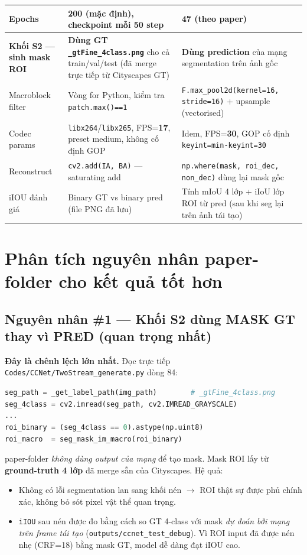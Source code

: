 \documentclass[12pt,a4paper]{article}
\begin{document}
\begin{table}[H]
\begin{tabular}{p{3.3cm} p{5.4cm} p{5.4cm}}
\addlinespace
Epochs & 200 (mặc định), checkpoint mỗi 50 step & 47 (theo paper) \\
\midrule
\textbf{Khối S2 — sinh mask ROI} &
  \textbf{Dùng GT $\,$\texttt{\_gtFine\_4class.png}} cho cả train/val/test (đã merge trực tiếp từ Cityscapes GT) &
  \textbf{Dùng prediction} của mạng segmentation trên ảnh gốc \\
\addlinespace
Macroblock filter &
  Vòng for Python, kiểm tra \texttt{patch.max()==1} &
  \texttt{F.max\_pool2d(kernel=16, stride=16)} + upsample (vectorised) \\
\addlinespace
Codec params &
  \texttt{libx264}/\texttt{libx265}, FPS=\textbf{17}, preset medium, không cố định GOP &
  Idem, FPS=\textbf{30}, GOP cố định \texttt{keyint=min-keyint=30} \\
\addlinespace
Reconstruct &
  \texttt{cv2.add(IA, BA)} — saturating add &
  \texttt{np.where(mask, roi\_dec, non\_dec)} dùng lại mask gốc \\
\addlinespace
iIOU đánh giá &
  Binary GT vs binary pred (file PNG đã lưu) &
  Tính mIoU 4 lớp + iIoU lớp ROI từ pred (sau khi seg lại trên ảnh tái tạo) \\
\bottomrule
\end{tabular}
\end{table}

\section{Phân tích nguyên nhân paper-folder cho kết quả tốt hơn}

\subsection{Nguyên nhân \#1 — Khối S2 dùng MASK GT thay vì PRED (quan trọng nhất)}

\textbf{Đây là chênh lệch lớn nhất.} Đọc trực tiếp
\texttt{Codes/CCNet/TwoStream\_generate.py} dòng 84:
\begin{lstlisting}[language=Python]
seg_path = _get_label_path(img_path)        # _gtFine_4class.png
seg_4class = cv2.imread(seg_path, cv2.IMREAD_GRAYSCALE)
...
roi_binary = (seg_4class == 0).astype(np.uint8)
roi_macro  = seg_mask_im_macro(roi_binary)
\end{lstlisting}

paper-folder \emph{không dùng output của mạng} để tạo mask. Mask ROI lấy từ
\textbf{ground-truth 4 lớp} đã merge sẵn của Cityscapes. Hệ quả:
\begin{itemize}[leftmargin=2em]
  \item Không có lỗi segmentation lan sang khối nén $\to$ ROI thật sự được phủ chính
        xác, không bỏ sót pixel vật thể quan trọng.
  \item \texttt{iIOU} sau nén được đo bằng cách so GT 4-class với mask
        \emph{dự đoán bởi mạng trên frame tái tạo} (\texttt{outputs/ccnet\_test\_debug}).
        Vì ROI input đã được nén nhẹ (CRF=18) bằng mask GT, model dễ dàng đạt iIOU cao.
\end{itemize}
\end{document}
